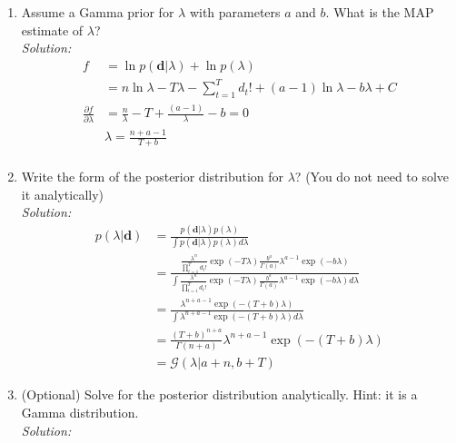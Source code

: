 \documentclass[12pt,a4paper]{article}
\begin{document}
\begin{enumerate}
  \item Assume a Gamma prior for $\lambda$ with parameters $a$ and $b$.  What is the MAP estimate of $\lambda$? \\
	  \emph{Solution:} \\
		  \begin{align*}
		  	f &= \ln p(\textbf{d} \vert \lambda)+\ln p(\lambda) \\
		  	&= n \ln \lambda - T\lambda - \sum_{t=1}^{T}d_t! + (a-1)\ln\lambda-b\lambda + C \\ 
		  	\frac{\partial f}{\partial \lambda} &= \frac{n}{\lambda} - T + \frac{(a - 1)}{\lambda} - b = 0 \\
		  	&\lambda = \frac{n + a -1}{T + b}\\
		  \end{align*}
  
  \item Write the form of the posterior distribution for $\lambda$? (You do not need to solve it analytically) \\
	  \emph{Solution:} \\
		  \begin{align*}
		  p(\lambda \vert \textbf{d}) &= \frac{p(\textbf{d}\vert \lambda)p(\lambda)}{\int p(\textbf{d}\vert \lambda)p(\lambda)d\lambda} \\
		  &= \frac{\frac{\lambda^n}{\prod_{t=1}^{T}d_t!} \exp(-T\lambda)\frac{b^a}{\Gamma(a)}\lambda^{a-1} \exp(-b\lambda)}{\int \frac{\lambda^n}{\prod_{t=1}^{T}d_t!}\exp(-T\lambda)\frac{b^a}{\Gamma(a)}\lambda^{a-1} \exp(-b\lambda)d\lambda}\\ 
		  &=\frac{\lambda^{n+a-1}\exp(-(T + b)\lambda)}{\int\lambda^{n+a-1}\exp(-(T + b)\lambda)d\lambda} \\
		  &=\frac{(T+b)^{n+a}}{\Gamma(n+a)}\lambda^{n+a-1}\exp(-(T + b)\lambda)\\
		  &= \mathcal{G}(\lambda \vert a + n, b + T)
		  \end{align*}
  
  
  \item (Optional) Solve for the posterior distribution analytically.  Hint: it is a Gamma distribution. \\
	  \emph{Solution:} \\
  
\end{enumerate}
\end{document}
